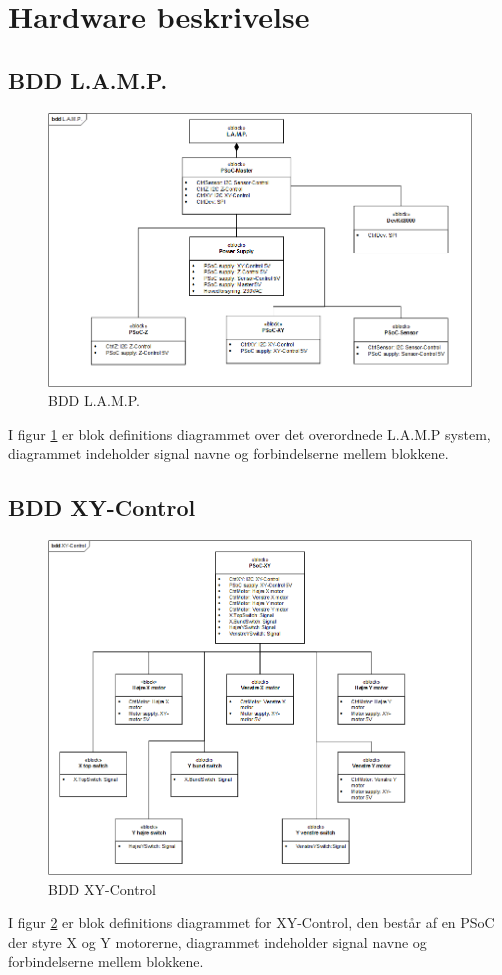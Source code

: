 \section{Hardware beskrivelse}

\subsection{BDD L.A.M.P.}
\begin{figure}[H] \centering
    \includegraphics[width=\textwidth]{0_Filer/Figuer/5_HW_Design/bddLAMPvers2.png}
    \caption{BDD L.A.M.P.}
    \label{fig:bddLAMP}
\end{figure}
I figur \ref{fig:bddLAMP} er blok definitions diagrammet over det overordnede L.A.M.P system, diagrammet indeholder signal navne og forbindelserne mellem blokkene.

\subsection{BDD XY-Control}
\begin{figure}[H] \centering
    \includegraphics[width=\textwidth]{0_Filer/Figuer/5_HW_Design/bddPSoC1vers2.png}
    \caption{BDD XY-Control}
    \label{fig:bddXY}
\end{figure}
I figur \ref{fig:bddXY} er blok definitions diagrammet for XY-Control, den består af en PSoC der styre X og Y motorerne, diagrammet indeholder signal navne og forbindelserne mellem blokkene.

